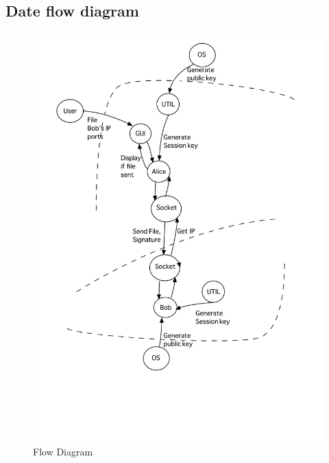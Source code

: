 \documentclass[a4paper,12pt]{article}
\begin{document}
\subsection{Date flow diagram}
\begin{figure}[htbp]
	\begin{center}
		\includegraphics[scale=0.6]{threat.pdf}
		\caption{Flow Diagram}
		\label{Flow Diagram}
	\end{center}
\end{figure}
\end{document}
